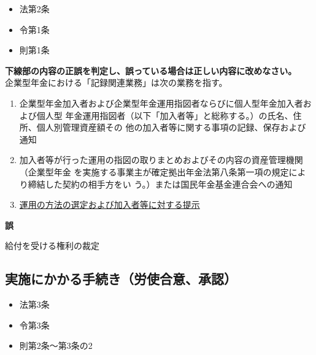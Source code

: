 \begin{InyouJobunbox}
  \begin{itemize}
    \item 法第2条
    \item 令第1条
    \item 則第1条
  \end{itemize}
\end{InyouJobunbox}

\begin{truefalse}[年金1 2019 問題1(3)\textcircled{1}]
\textbf{下線部の内容の正誤を判定し、誤っている場合は正しい内容に改めなさい。}
\\

企業型年金における「記録関連業務」は次の業務を指す。
\begin{enumerate}
  \item 企業型年金加入者および企業型年金運用指図者ならびに個人型年金加入者および個人型
年金運用指図者（以下「加入者等」と総称する。）の氏名、住所、個人別管理資産額その
他の加入者等に関する事項の記録、保存および通知
\item 加入者等が行った運用の指図の取りまとめおよびその内容の資産管理機関（企業型年金
を実施する事業主が確定拠出年金法第八条第一項の規定により締結した契約の相手方をい
う。）または国民年金基金連合会への通知
\item \underline{運用の方法の選定および加入者等に対する提示}

\end{enumerate}
\end{truefalse}

\begin{answerbox}
  \textbf{誤}

  給付を受ける権利の裁定
\end{answerbox}

\newpage

\subsection{実施にかかる手続き（労使合意、承認）}

\begin{InyouJobunbox}
  \begin{itemize}
    \item 法第3条
    \item 令第3条
    \item 則第2条〜第3条の2
  \end{itemize}
\end{InyouJobunbox}

